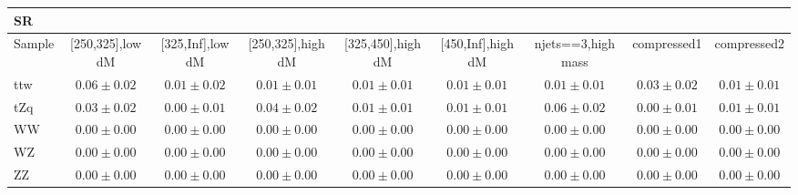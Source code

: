 \begin{table}
\begin{center}
\small
\begin{tabular}{lcccccccc}
\hline
SR & & & & & & & &\\
\hline
Sample&[250,325],low dM&[325,Inf],low dM&[250,325],high dM&[325,450],high dM&[450,Inf],high dM&njets==3,high mass&compressed1&compressed2\\
\hline
ttw&$0.06\pm0.02$&$0.01\pm0.02$&$0.01\pm0.01$&$0.01\pm0.01$&$0.01\pm0.01$&$0.01\pm0.01$&$0.03\pm0.02$&$0.01\pm0.01$\\
\hline
tZq&$0.03\pm0.02$&$0.00\pm0.01$&$0.04\pm0.02$&$0.01\pm0.01$&$0.01\pm0.01$&$0.06\pm0.02$&$0.00\pm0.01$&$0.01\pm0.01$\\
WW&$0.00\pm0.00$&$0.00\pm0.00$&$0.00\pm0.00$&$0.00\pm0.00$&$0.00\pm0.00$&$0.00\pm0.00$&$0.00\pm0.00$&$0.00\pm0.00$\\
WZ&$0.00\pm0.00$&$0.00\pm0.00$&$0.00\pm0.00$&$0.00\pm0.00$&$0.00\pm0.00$&$0.00\pm0.00$&$0.00\pm0.00$&$0.00\pm0.00$\\
ZZ&$0.00\pm0.00$&$0.00\pm0.00$&$0.00\pm0.00$&$0.00\pm0.00$&$0.00\pm0.00$&$0.00\pm0.00$&$0.00\pm0.00$&$0.00\pm0.00$\\
\hline\hline
\end{tabular}
\end{center}
\end{table}

